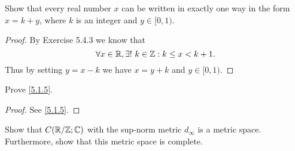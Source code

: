 \begin{ex}\label{ex:5.1.1}
  Show that every real number \(x\) can be written in exactly one way in the form \(x = k + y\), where \(k\) is an integer and \(y \in [0, 1)\).
\end{ex}

\begin{proof}
  By Exercise 5.4.3 we know that
  \[
    \forall x \in \mathbb{R}, \exists!\ k \in \mathbb{Z} : k \leq x < k + 1.
  \]
  Thus by setting \(y = x - k\) we have \(x = y + k\) and \(y \in [0, 1)\).
\end{proof}

\begin{ex}\label{ex:5.1.2}
  Prove \cref{5.1.5}.
\end{ex}

\begin{proof}
  See \cref{5.1.5}.
\end{proof}

\begin{ex}\label{ex:5.1.3}
  Show that \(C(\mathbb{R} / \mathbb{Z} ; \mathbb{C})\) with the sup-norm metric \(d_\infty\) is a metric space.
  Furthermore, show that this metric space is complete.
\end{ex}

